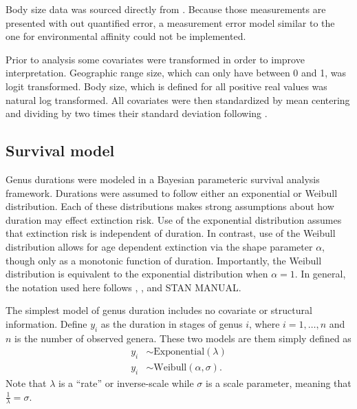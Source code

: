 \documentclass[12pt,letterpaper]{article}
\begin{document}
Body size data was sourced directly from \citet{Payne2014}. Because those measurements are presented with out quantified error, a measurement error model similar to the one for environmental affinity could not be implemented.

Prior to analysis some covariates were transformed in order to improve interpretation. Geographic range size, which can only have between 0 and 1, was logit transformed. Body size, which is defined for all positive real values was natural log transformed. All covariates were then standardized by mean centering and dividing by two times their standard deviation following \citet{Gelman2007}.


\subsection{Survival model}

Genus durations were modeled in a Bayesian parameteric survival analysis framework. Durations were assumed to follow either an exponential or Weibull distribution. Each of these distributions makes strong assumptions about how duration may effect extinction risk. Use of the exponential distribution assumes that extinction risk is independent of duration. In contrast, use of the Weibull distribution allows for age dependent extinction via the shape parameter \(\alpha\), though only as a monotonic function of duration. Importantly, the Weibull distribution is equivalent to the exponential distribution when \(\alpha = 1\). In general, the notation used here follows \citet{Gelman2007}, \citet{Gelman2013d}, and \uppercase{stan manual}.

The simplest model of genus duration includes no covariate or structural information. Define \(y_{i}\) as the duration in stages of genus \(i\), where \(i = 1, \dots, n\) and \(n\) is the number of observed genera. These two models are them simply defined as
\begin{equation}
  \begin{aligned}
    y_{i} &\sim \mathrm{Exponential}(\lambda) \\
    y_{i} &\sim \mathrm{Weibull}(\alpha, \sigma).
  \end{aligned}
  \label{eq:simple}
\end{equation}
Note that \(\lambda\) is a ``rate'' or inverse-scale while \(\sigma\) is a scale parameter, meaning that \(\frac{1}{\lambda} = \sigma\).
\end{document}
